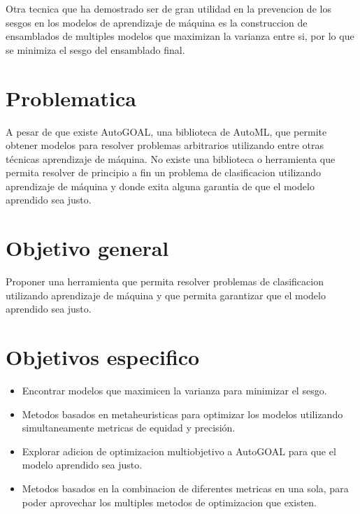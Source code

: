 Otra tecnica que ha demostrado ser de gran utilidad en la prevencion de los sesgos en los modelos de aprendizaje de máquina es la construccion de ensamblados de multiples modelos que maximizan la varianza entre si, por lo que se minimiza el sesgo del ensamblado final.

\section*{Problematica}

A pesar de que existe AutoGOAL, una biblioteca de AutoML, que permite obtener modelos para resolver problemas arbitrarios utilizando entre otras técnicas aprendizaje de máquina. No existe una biblioteca o herramienta que permita resolver de principio a fin un problema de clasificacion utilizando aprendizaje de máquina y donde exita alguna garantia de que el modelo aprendido sea justo.

\section*{Objetivo general}

Proponer una herramienta que permita resolver problemas de clasificacion utilizando aprendizaje de máquina y que permita garantizar que el modelo aprendido sea justo.

\section*{Objetivos especifico}

\begin{itemize}
    \item Encontrar modelos que maximicen la varianza para minimizar el sesgo.
    \item Metodos basados en metaheuristicas para optimizar los modelos utilizando simultaneamente metricas de equidad y precisión.
    \item Explorar adicion de optimizacion multiobjetivo a AutoGOAL para que el modelo aprendido sea justo.
    \item Metodos basados en la combinacion de diferentes metricas en una sola, para poder aprovechar los multiples metodos de optimizacion que existen.
\end{itemize}
